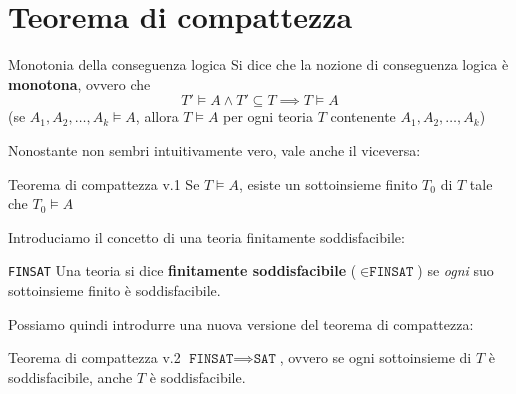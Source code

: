 \documentclass[a4paper,11pt]{report}
\begin{document}
\newpage

\section{Teorema di compattezza}

\begin{defframe}{Monotonia della conseguenza logica}{}
    Si dice che la nozione di conseguenza logica è \textbf{monotona}, ovvero che \[T' \vDash A \land T' \subseteq T \implies T \vDash A\]
    (se \( A_1, A_2, \dots, A_k \vDash A \), allora \( T \vDash A \) per ogni teoria \( T \) contenente \( A_1, A_2, \dots, A_k \))
\end{defframe}

Nonostante non sembri intuitivamente vero, vale anche il viceversa:

\begin{thmframe}{Teorema di compattezza v.1}{}
    Se \( T \vDash A \), esiste un sottoinsieme finito \( T_0 \) di \( T \) tale che \( T_0 \vDash A \)
\end{thmframe}

Introduciamo il concetto di una teoria finitamente soddisfacibile:

\begin{defframe}{\texttt{FINSAT}}{}
    Una teoria si dice \textbf{finitamente soddisfacibile} (\( \in \texttt{FINSAT} \)) se \textit{ogni} suo sottoinsieme finito è soddisfacibile.
\end{defframe}

Possiamo quindi introdurre una nuova versione del teorema di compattezza:

\begin{thmframe}{Teorema di compattezza v.2}{}
    \( \texttt{FINSAT}\implies \texttt{SAT} \), ovvero se ogni sottoinsieme di \( T \) è soddisfacibile, anche \( T \) è soddisfacibile.
\end{thmframe}
\end{document}

